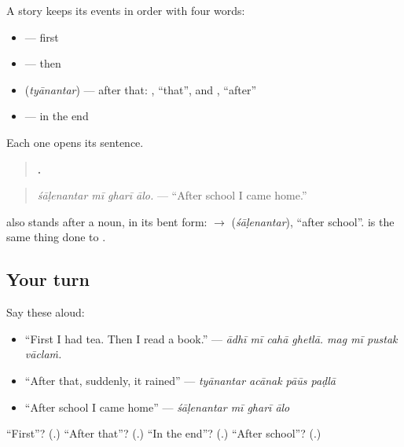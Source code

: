 A story keeps its events in order with four words:

\begin{itemize}
\raggedright
  \item \textbf{} — first
  \item \textbf{} — then
  \item \textbf{} (\emph{tyānantar}) — after that: \textbf{}, \textquotedblleft{}that\textquotedblright{}, and \textbf{}, \textquotedblleft{}after\textquotedblright{}
  \item \textbf{} — in the end
\end{itemize}

Each one opens its sentence.

\begin{grammarlens}[title={Grammar Lens: -\mr{नंतर} after a noun}]
\begin{quote}
\textbf{   .}
\end{quote}

\begin{quote}
\emph{śāḷenantar mī gharī ālo.} — \textquotedblleft{}After school I came home.\textquotedblright{}
\end{quote}

\textbf{} also stands after a noun, in its bent form: \textbf{} $\to$ \textbf{} (\emph{śāḷenantar}), \textquotedblleft{}after school\textquotedblright{}. \textbf{} is the same thing done to \textbf{}.
\end{grammarlens}

\subsection*{Your turn}
Say these aloud:

\begin{itemize}
\raggedright
  \item \textquotedblleft{}First I had tea. Then I read a book.\textquotedblright{} — \emph{ādhī mī cahā ghetlā. mag mī pustak vāclaṁ.}
  \item \textquotedblleft{}After that, suddenly, it rained\textquotedblright{} — \emph{tyānantar acānak pāūs paḍlā}
  \item \textquotedblleft{}After school I came home\textquotedblright{} — \emph{śāḷenantar mī gharī ālo}
\end{itemize}

\begin{tcolorbox}[breakable,colback=teal!4,colframe=teal!35!black,title={Before you move on}]
\textquotedblleft{}First\textquotedblright{}? (\textbf{}.) \textquotedblleft{}After that\textquotedblright{}? (\textbf{}.) \textquotedblleft{}In the end\textquotedblright{}? (\textbf{}.) \textquotedblleft{}After school\textquotedblright{}? (\textbf{}.)
\end{tcolorbox}
